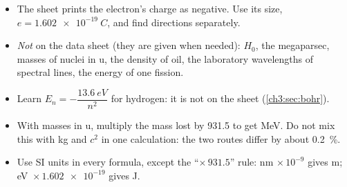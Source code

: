 \begin{itemize}
  \item The sheet prints the electron's charge as negative. Use its size,
        $e = \qty{1.602e-19}{C}$, and find directions separately.
  \item \emph{Not} on the data sheet (they are given when needed): $H_0$, the megaparsec,
        masses of nuclei in u, the density of oil, the laboratory wavelengths of spectral
        lines, the energy of one fission.
  \item Learn $E_n = -\dfrac{\qty{13.6}{eV}}{n^2}$ for hydrogen: it is not on the sheet
        (\cref{ch3:sec:bohr}).
  \item With masses in u, multiply the mass lost by 931.5 to get MeV. Do not mix this with
        kg and $c^2$ in one calculation: the two routes differ by about \qty{0.2}{\percent}.
  \item Use SI units in every formula, except the ``$\times\,931.5$'' rule: nm
        $\times\,10^{-9}$ gives m; \mbox{eV $\times\,\num{1.602e-19}$} gives J.
\end{itemize}
